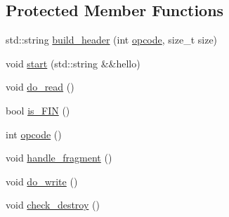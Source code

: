 \subsection*{Protected Member Functions}
\begin{DoxyCompactItemize}
\item 
std\-::string \hyperlink{classcrow_1_1websocket_1_1_connection_acb61dbbdd467860fcb3b3026374dc85a}{build\-\_\-header} (int \hyperlink{classcrow_1_1websocket_1_1_connection_a47a804e0269c7e70f45434f7618c6e7b}{opcode}, size\-\_\-t size)
\item 
void \hyperlink{classcrow_1_1websocket_1_1_connection_a24f90aa6961994abef482699e7ffe037}{start} (std\-::string \&\&hello)
\item 
void \hyperlink{classcrow_1_1websocket_1_1_connection_addd1692463d34ff141c02c48f0b46431}{do\-\_\-read} ()
\item 
bool \hyperlink{classcrow_1_1websocket_1_1_connection_aff28834d3434b6d24a01830667247111}{is\-\_\-\-F\-I\-N} ()
\item 
int \hyperlink{classcrow_1_1websocket_1_1_connection_a47a804e0269c7e70f45434f7618c6e7b}{opcode} ()
\item 
void \hyperlink{classcrow_1_1websocket_1_1_connection_a41c1d8a6f57071a43edcb532d528780c}{handle\-\_\-fragment} ()
\item 
void \hyperlink{classcrow_1_1websocket_1_1_connection_a7089a3814af7e3c6e6a82c22865ee852}{do\-\_\-write} ()
\item 
void \hyperlink{classcrow_1_1websocket_1_1_connection_a1f3552060d7e93a3a0d0f2ea9d84a8df}{check\-\_\-destroy} ()
\end{DoxyCompactItemize}


